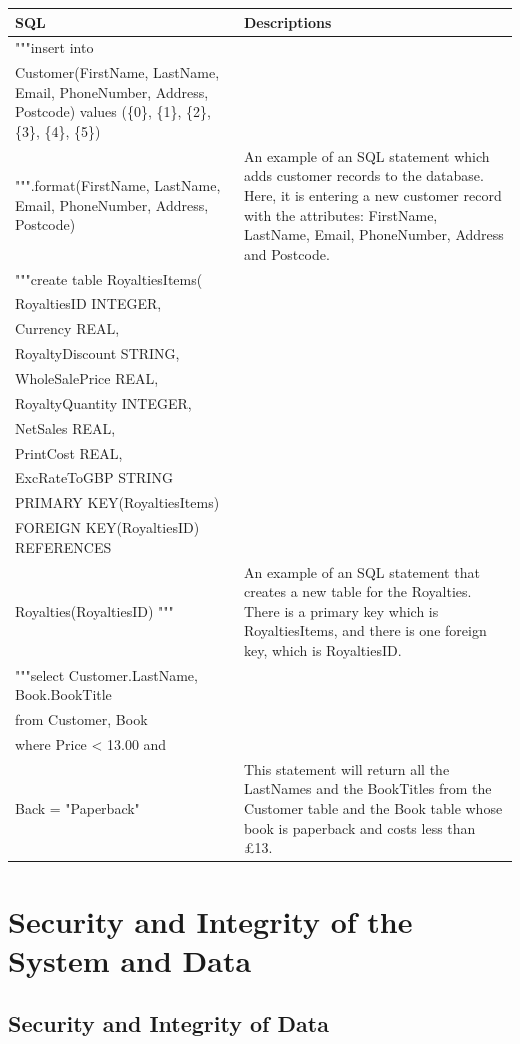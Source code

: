 \begin{tabular}{|p{10cm}|p{5cm}|}
    \hline
    \textbf{SQL} & \textbf{Descriptions} \\ \hline 
     """insert into \\ Customer(FirstName, LastName, Email, PhoneNumber, Address, Postcode) values (\{0\}, \{1\}, \{2\}, \{3\}, \{4\}, \{5\}) \\ """.format(FirstName, LastName, Email, PhoneNumber, Address, Postcode) & An example of an SQL statement which adds customer records to the database. Here, it is entering a new customer record with the attributes: FirstName, LastName, Email, PhoneNumber, Address and Postcode. \\ \hline
    """create table RoyaltiesItems(\\ RoyaltiesID INTEGER, \\ Currency REAL, \\ RoyaltyDiscount STRING,\\  WholeSalePrice REAL,\\ RoyaltyQuantity INTEGER,\\ NetSales REAL,\\ PrintCost REAL, \\ ExcRateToGBP STRING \\ PRIMARY KEY(RoyaltiesItems) \\ FOREIGN KEY(RoyaltiesID) REFERENCES \\ Royalties(RoyaltiesID) """ & An example of an SQL statement that creates a new table for the Royalties. There is a primary key which is RoyaltiesItems, and there is one foreign key, which is RoyaltiesID. \\ \hline 
    """select Customer.LastName, Book.BookTitle \\ from Customer, Book \\ where Price < 13.00 and \\ Back = "Paperback"  & This statement will return all the LastNames and the BookTitles from the Customer table and the Book table whose book is paperback and costs less than £13. \\ \hline
\end{tabular}

\section{Security and Integrity of the System and Data}

\subsection{Security and Integrity of Data}

